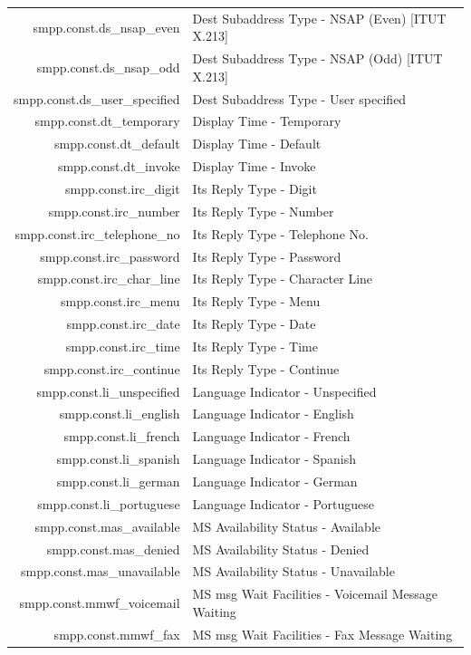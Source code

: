 \documentclass[a4paper,latin]{paper}
\begin{document}
\begin{tabularx}{\linewidth}{ | >{\ttfamily} r | >{\ttfamily} X |}
	smpp.const.ds\_nsap\_even			& Dest Subaddress Type - NSAP (Even) [ITUT X.213]\\
	smpp.const.ds\_nsap\_odd			& Dest Subaddress Type - NSAP (Odd) [ITUT X.213]\\
	smpp.const.ds\_user\_specified			& Dest Subaddress Type - User specified\\
	smpp.const.dt\_temporary			& Display Time - Temporary\\
	smpp.const.dt\_default				& Display Time - Default\\
	smpp.const.dt\_invoke				& Display Time - Invoke\\
	smpp.const.irc\_digit				& Its Reply Type - Digit\\
	smpp.const.irc\_number				& Its Reply Type - Number\\
	smpp.const.irc\_telephone\_no			& Its Reply Type - Telephone No.\\
	smpp.const.irc\_password			& Its Reply Type - Password\\
	smpp.const.irc\_char\_line			& Its Reply Type - Character Line\\
	smpp.const.irc\_menu				& Its Reply Type - Menu\\
	smpp.const.irc\_date				& Its Reply Type - Date\\
	smpp.const.irc\_time				& Its Reply Type - Time\\
	smpp.const.irc\_continue			& Its Reply Type - Continue\\
	smpp.const.li\_unspecified			& Language Indicator - Unspecified\\
	smpp.const.li\_english				& Language Indicator - English\\
	smpp.const.li\_french				& Language Indicator - French\\
	smpp.const.li\_spanish				& Language Indicator - Spanish\\
	smpp.const.li\_german				& Language Indicator - German\\
	smpp.const.li\_portuguese			& Language Indicator - Portuguese\\
	smpp.const.mas\_available			& MS Availability Status - Available\\
	smpp.const.mas\_denied				& MS Availability Status - Denied\\
	smpp.const.mas\_unavailable			& MS Availability Status - Unavailable\\
	smpp.const.mmwf\_voicemail			& MS msg Wait Facilities - Voicemail Message Waiting\\
	smpp.const.mmwf\_fax				& MS msg Wait Facilities - Fax Message Waiting\\

\end{tabularx}
\end{document}

